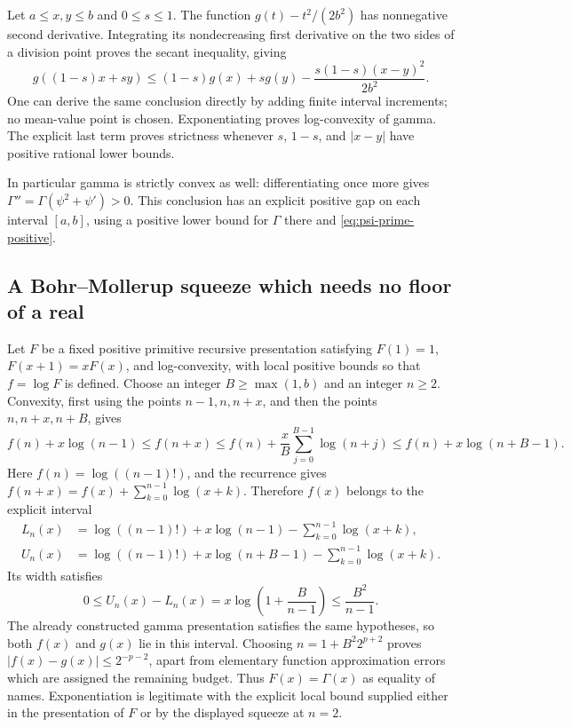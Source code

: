 Let $a\le x,y\le b$ and $0\le s\le1$.  The function
$g(t)-t^2/(2b^2)$ has nonnegative second derivative.  Integrating its
nondecreasing first derivative on the two sides of a division point proves
the secant inequality, giving
\begin{equation}\label{eq:strong-log-convexity}
 g((1-s)x+sy)
 \le(1-s)g(x)+sg(y)-\frac{s(1-s)(x-y)^2}{2b^2}.
\end{equation}
One can derive the same conclusion directly by adding finite interval
increments; no mean-value point is chosen.  Exponentiating proves
log-convexity of gamma.  The explicit last term proves strictness whenever
$s$, $1-s$, and $|x-y|$ have positive rational lower bounds.

In particular gamma is strictly convex as well: differentiating once more
gives $\Gamma''=\Gamma(\psi^2+\psi')>0$.  This conclusion has an explicit
positive gap on each interval $[a,b]$, using a positive lower bound for
$\Gamma$ there and \eqref{eq:psi-prime-positive}.

\subsection{A Bohr--Mollerup squeeze which needs no floor of a real}

Let $F$ be a fixed positive primitive recursive presentation satisfying
$F(1)=1$, $F(x+1)=xF(x)$, and log-convexity, with local positive bounds so
that $f=\log F$ is defined.  Choose an integer $B\ge\max(1,b)$ and an
integer $n\ge2$.  Convexity, first using the points $n-1,n,n+x$, and then
the points $n,n+x,n+B$, gives
\[
 f(n)+x\log(n-1)
 \le f(n+x)
 \le f(n)+\frac{x}{B}\sum_{j=0}^{B-1}\log(n+j)
 \le f(n)+x\log(n+B-1).
\]
Here $f(n)=\log((n-1)!)$, and the recurrence gives
$f(n+x)=f(x)+\sum_{k=0}^{n-1}\log(x+k)$.  Therefore $f(x)$ belongs to
the explicit interval
\begin{align*}
 L_n(x)&=\log((n-1)!)+x\log(n-1)
              -\sum_{k=0}^{n-1}\log(x+k),\\
 U_n(x)&=\log((n-1)!)+x\log(n+B-1)
              -\sum_{k=0}^{n-1}\log(x+k).
\end{align*}
Its width satisfies
\begin{equation}\label{eq:bm-width-general}
 0\le U_n(x)-L_n(x)
 =x\log\left(1+\frac{B}{n-1}\right)
 \le\frac{B^2}{n-1}.
\end{equation}
The already constructed gamma presentation satisfies the same hypotheses,
so both $f(x)$ and $g(x)$ lie in this interval.  Choosing
$n=1+B^2 2^{p+2}$ proves $|f(x)-g(x)|\le2^{-p-2}$, apart from elementary
function approximation errors which are assigned the remaining budget.
Thus $F(x)=\Gamma(x)$ as equality of names.  Exponentiation is legitimate
with the explicit local bound supplied either in the presentation of $F$
or by the displayed squeeze at $n=2$.

